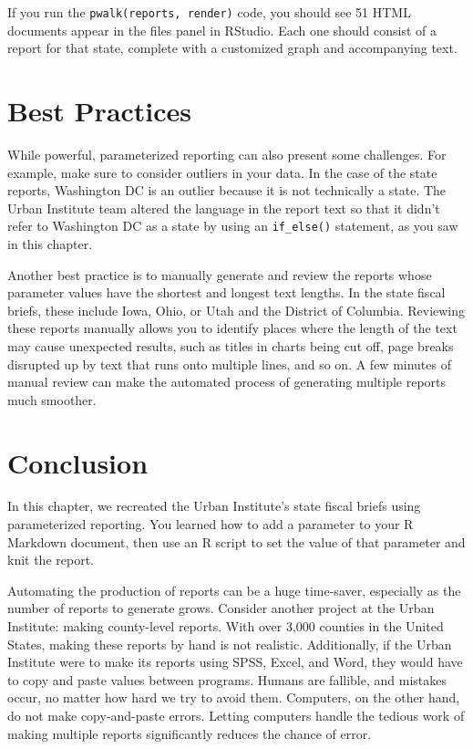 \documentclass[
]{book}
\begin{document}
If you run the \texttt{pwalk(reports,\ render)} code, you should see 51 HTML documents appear in the files panel in RStudio. Each one should consist of a report for that state, complete with a customized graph and accompanying text.

\hypertarget{best-practices}{%
\section*{Best Practices}\label{best-practices}}

While powerful, parameterized reporting can also present some challenges. For example, make sure to consider outliers in your data. In the case of the state reports, Washington DC is an outlier because it is not technically a state. The Urban Institute team altered the language in the report text so that it didn't refer to Washington DC as a state by using an \texttt{if\_else()} statement, as you saw in this chapter.

Another best practice is to manually generate and review the reports whose parameter values have the shortest and longest text lengths. In the state fiscal briefs, these include Iowa, Ohio, or Utah and the District of Columbia. Reviewing these reports manually allows you to identify places where the length of the text may cause unexpected results, such as titles in charts being cut off, page breaks disrupted up by text that runs onto multiple lines, and so on. A few minutes of manual review can make the automated process of generating multiple reports much smoother.

\hypertarget{conclusion-4}{%
\section*{Conclusion}\label{conclusion-4}}

In this chapter, we recreated the Urban Institute's state fiscal briefs using parameterized reporting. You learned how to add a parameter to your R Markdown document, then use an R script to set the value of that parameter and knit the report.

Automating the production of reports can be a huge time-saver, especially as the number of reports to generate grows. Consider another project at the Urban Institute: making county-level reports. With over 3,000 counties in the United States, making these reports by hand is not realistic. Additionally, if the Urban Institute were to make its reports using SPSS, Excel, and Word, they would have to copy and paste values between programs. Humans are fallible, and mistakes occur, no matter how hard we try to avoid them. Computers, on the other hand, do not make copy-and-paste errors. Letting computers handle the tedious work of making multiple reports significantly reduces the chance of error.
\end{document}
